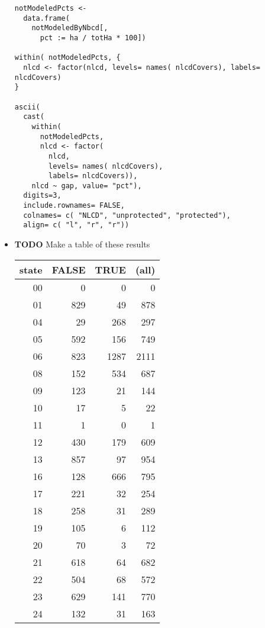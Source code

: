 \documentclass[11pt]{article}
\begin{document}
\begin{itemize}
\begin{verbatim}
notModeledPcts <- 
  data.frame(
    notModeledByNbcd[,
      pct := ha / totHa * 100])

within( notModeledPcts, {
  nlcd <- factor(nlcd, levels= names( nlcdCovers), labels= nlcdCovers)
}

ascii(
  cast(
    within(
      notModeledPcts,
      nlcd <- factor(
        nlcd,
        levels= names( nlcdCovers),
        labels= nlcdCovers)),
    nlcd ~ gap, value= "pct"),
  digits=3,
  include.rownames= FALSE,
  colnames= c( "NLCD", "unprotected", "protected"),
  align= c( "l", "r", "r"))
\end{verbatim}



\item \textbf{TODO} Make a table of these results\\
\label{sec-3-5-5-2}%
\begin{center}
\begin{tabular}{rrrr}
 state  &  FALSE  &  TRUE  &  (all)  \\
\hline
    00  &      0  &     0  &      0  \\
    01  &    829  &    49  &    878  \\
    04  &     29  &   268  &    297  \\
    05  &    592  &   156  &    749  \\
    06  &    823  &  1287  &   2111  \\
    08  &    152  &   534  &    687  \\
    09  &    123  &    21  &    144  \\
    10  &     17  &     5  &     22  \\
    11  &      1  &     0  &      1  \\
    12  &    430  &   179  &    609  \\
    13  &    857  &    97  &    954  \\
    16  &    128  &   666  &    795  \\
    17  &    221  &    32  &    254  \\
    18  &    258  &    31  &    289  \\
    19  &    105  &     6  &    112  \\
    20  &     70  &     3  &     72  \\
    21  &    618  &    64  &    682  \\
    22  &    504  &    68  &    572  \\
    23  &    629  &   141  &    770  \\
    24  &    132  &    31  &    163  \\

\end{tabular}
\end{center}
\end{itemize}
\end{document}
